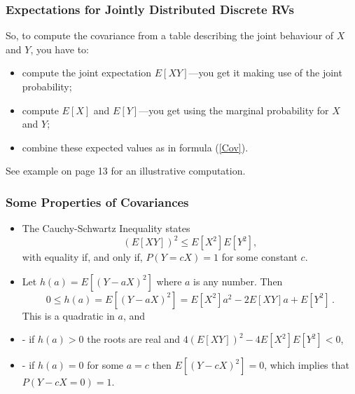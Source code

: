 \documentclass[notes=show,handout]{beamer}
\newenvironment{stepitemize}{\begin{itemize}[<+->]}{\end{itemize} }
\renewcommand{\Pr}{P}
\begin{document}
\begin{frame}
\frametitle{Expectations for Jointly Distributed Discrete RVs}

So, to compute the covariance from a table describing the joint behaviour of $X$ and $Y$, you have to:

\begin{itemize}
\item compute the joint expectation $E[XY]$---you get it making use of the joint probability; \vspace{0.2cm}
\item compute $E[X]$ and $E[Y]$---you get using the marginal probability for $X$ and $Y$; \vspace{0.2cm}
\item combine these expected values as in formula (\ref{Cov}). 

\end{itemize}

See example on page 13 for an illustrative computation.

\end{frame}



\begin{frame}%

\frametitle{Some Properties of Covariances }


    \begin{stepitemize}

\item The Cauchy-Schwartz Inequality states 
$$(E\left[ XY\right])^2\leq E\left[ X^2\right]E\left[ Y^2\right],
$$ 
with equality if, and only if, $\Pr(Y=cX)=1$ for some constant $c$.

\vspace{0.4cm}

\item Let $h(a)=E[(Y-aX)^2]$ where $a$ is any number. Then
$$
0\leq h(a)=E[(Y-aX)^2]=E[X^2]a^2-2E[XY]a+E[Y^2]\,.
$$
This is a quadratic in $a$, and
\item[-] if $h(a)>0$ the roots are real and $4(E[XY])^2-4E[X^2]E[Y^2]<0$,
\item[-] if $h(a)=0$ for some $a=c$ then $E[(Y-cX)^2]=0$, which implies that $\Pr(Y-cX=0)=1$.
\end{stepitemize}
\end{frame}%
\end{document}
